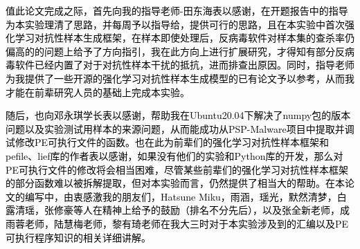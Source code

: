 
\begin{acknowledgements}

\textcolor{black}{值此论文完成之际，首先向我的指导老师-田东海表以感谢，在开题报告中的指导为本实验理清了思路，并每周予以指导给，提供可行的思路，且在本实验中首次强化学习对抗性样本生成框架，在样本即使处理后，反病毒软件对样本集的查杀率仍偏高的的问题上给予了方向指引，我在此方向上进行扩展研究，才得知有部分反病毒软件已经内置了对于对抗性样本干扰的抵抗，进而排查出原因。同时，指导老师为我提供了一些开源的强化学习对抗性样本生成模型的已有论文予以参考，从而我才能在前辈研究人员的基础上完成本实验。}

\textcolor{black}{随后，也向邓永琪学长表以感谢，帮助我在Ubuntu20.04下解决了numpy包的版本问题以及实验测试用样本的来源问题，从而能成功从PSP-Malware项目中提取并调试修改PE可执行文件的函数。也在此为前辈们的强化学习对抗性样本框架和pefile、lief库的作者表以感谢，如果没有他们的实验和Python库的开发，那么对PE可执行文件的修改将会相当困难，尽管某些前辈们的强化学习对抗性样本框架的部分函数难以被拆解提取，但对本实验而言，仍然提供了相当大的帮助。在本论文的编写中，由衷感激我的朋友们，Hatsune Miku，雨涵，瑶光，默然清梦，白露清瑶，张修豪等人在精神上给予的鼓励（排名不分先后），以及张全新老师，成雨蓉老师，陆慧梅老师，黎有琦老师在我大三时对于本实验涉及到的汇编以及PE可执行程序知识的相关详细讲解。}

\end{acknowledgements}
